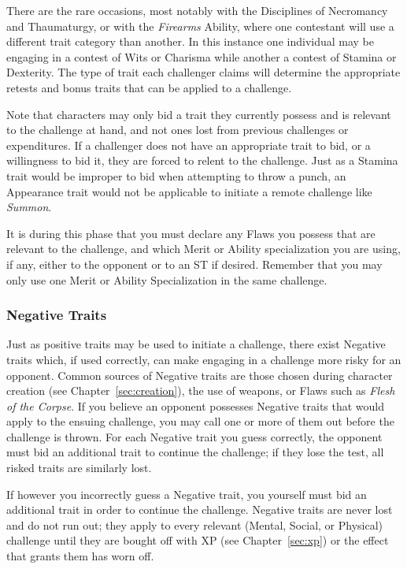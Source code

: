 There are the rare occasions, most notably with the Disciplines of Necromancy and Thaumaturgy, or with 
the \emph{Firearms} Ability, where one contestant will use a different trait category than another.  In 
this instance one individual may be engaging in a contest of Wits or Charisma while another a contest of 
Stamina or Dexterity.  The type of trait each challenger claims will determine the appropriate retests and 
bonus traits that can be applied to a challenge.

Note that characters may only bid a trait they currently possess and is relevant to the challenge at hand, 
and not ones lost from previous challenges or expenditures.  If a challenger does not have an appropriate 
trait to bid, or a willingness to bid it, they are forced to relent to the challenge.  Just as a Stamina 
trait would be improper to bid when attempting to throw a punch, an Appearance trait would not be applicable 
to initiate a remote challenge like \emph{Summon}.

It is during this phase that you must declare any Flaws you possess that are relevant to the challenge, and which 
Merit or Ability specialization you are using, if any, either to the opponent or to an ST if desired.  Remember that 
you may only use one Merit or Ability Specialization in the same challenge.

\subsubsection{Negative Traits}
Just as positive traits may be used to initiate a challenge, there exist Negative traits which, if used 
correctly, can make engaging in a challenge more risky for an opponent.  Common sources of Negative traits 
are those chosen during character creation (see Chapter~\ref{sec:creation}), the use of weapons, or Flaws 
such as \emph{Flesh of the Corpse}.  If you believe an opponent possesses Negative traits that would apply 
to the ensuing challenge, you may call one or more of them out before the challenge is thrown.  For each 
Negative trait you guess correctly, the opponent must bid an additional trait to continue the challenge; 
if they lose the test, all risked traits are similarly lost.

If however you incorrectly guess a Negative trait, you yourself must bid an additional trait in order to 
continue the challenge.  Negative traits are never lost and do not run out; they apply to every relevant 
(Mental, Social, or Physical) challenge until they are bought off with XP (see Chapter~\ref{sec:xp}) or the 
effect that grants them has worn off.

